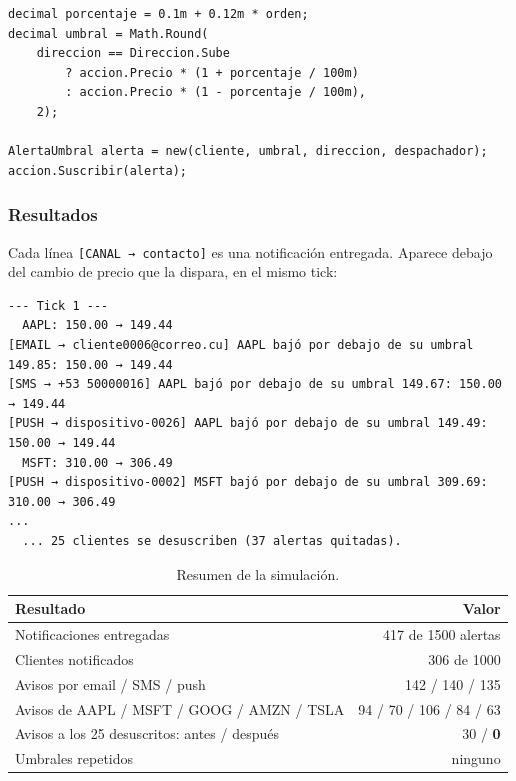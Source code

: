 \begin{lstlisting}[basicstyle=\ttfamily\footnotesize, columns=fullflexible, keepspaces=true, caption={\texttt{Demos/SimulacionBolsa.cs}: cada alerta es un observador con su propio umbral.}]
decimal porcentaje = 0.1m + 0.12m * orden;
decimal umbral = Math.Round(
    direccion == Direccion.Sube
        ? accion.Precio * (1 + porcentaje / 100m)
        : accion.Precio * (1 - porcentaje / 100m),
    2);

AlertaUmbral alerta = new(cliente, umbral, direccion, despachador);
accion.Suscribir(alerta);
\end{lstlisting}

\subsubsection{Resultados}

Cada línea \texttt{[CANAL → contacto]} es una notificación entregada. Aparece debajo del
cambio de precio que la dispara, en el mismo tick:

\begin{lstlisting}[language={}, numbers=none, basicstyle=\ttfamily\scriptsize, columns=fullflexible, keepspaces=true]
--- Tick 1 ---
  AAPL: 150.00 → 149.44
[EMAIL → cliente0006@correo.cu] AAPL bajó por debajo de su umbral 149.85: 150.00 → 149.44
[SMS → +53 50000016] AAPL bajó por debajo de su umbral 149.67: 150.00 → 149.44
[PUSH → dispositivo-0026] AAPL bajó por debajo de su umbral 149.49: 150.00 → 149.44
  MSFT: 310.00 → 306.49
[PUSH → dispositivo-0002] MSFT bajó por debajo de su umbral 309.69: 310.00 → 306.49
...
  ... 25 clientes se desuscriben (37 alertas quitadas).
\end{lstlisting}

\begin{table}[H]
\centering
\small
\begin{tabular}{lr}
\toprule
\textbf{Resultado} & \textbf{Valor} \\
\midrule
Notificaciones entregadas & 417 de 1500 alertas \\
Clientes notificados & 306 de 1000 \\
\addlinespace
Avisos por email / SMS / push & 142 / 140 / 135 \\
\addlinespace
Avisos de AAPL / MSFT / GOOG / AMZN / TSLA & 94 / 70 / 106 / 84 / 63 \\
\addlinespace
Avisos a los 25 desuscritos: antes / después & 30 / \textbf{0} \\
Umbrales repetidos & ninguno \\
\bottomrule
\end{tabular}
\caption{Resumen de la simulación.}
\end{table}

